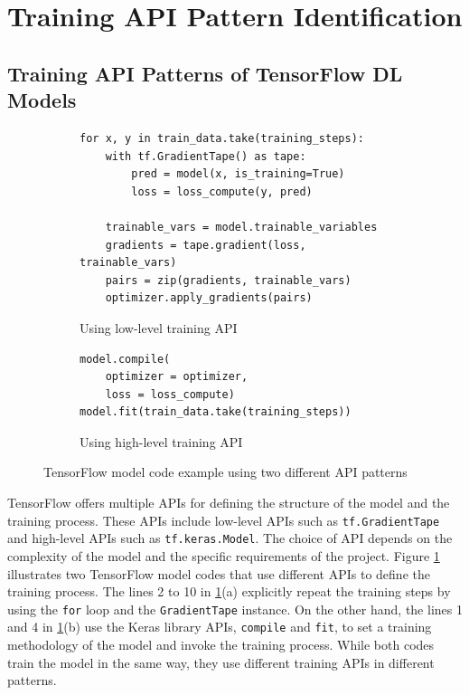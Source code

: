 \pagebreak
\section{Training API Pattern Identification}\label{sec:pattern}

\subsection{Training API Patterns of TensorFlow DL Models}

\begin{figure}[ht!]
\centering
  \begin{subfigure}[b]{\textwidth}
    \begin{lstlisting}[style=mpython]
for x, y in train_data.take(training_steps):
    with tf.GradientTape() as tape:
        pred = model(x, is_training=True)
        loss = loss_compute(y, pred)

    trainable_vars = model.trainable_variables
    gradients = tape.gradient(loss, trainable_vars)
    pairs = zip(gradients, trainable_vars)
    optimizer.apply_gradients(pairs)\end{lstlisting}
    \caption{Using low-level training API}
  \end{subfigure}
  \hspace{5mm}
  \begin{subfigure}[b]{\textwidth}
    \begin{lstlisting}[style=mpython]
model.compile(
    optimizer = optimizer, 
    loss = loss_compute) 
model.fit(train_data.take(training_steps))\end{lstlisting} 
    \caption{Using high-level training API}
  \end{subfigure}

  \caption{TensorFlow model code example using two different API patterns}
  \label{fig:pattern:ex01}
\end{figure}

TensorFlow offers multiple APIs for defining the structure of the model and the
training process. 
These APIs include low-level APIs such as {\tt tf.GradientTape} and high-level
APIs such as {\tt tf.keras.Model}.
The choice of API depends on the complexity of the model and the specific
requirements of the project.
Figure \ref{fig:pattern:ex01} illustrates two TensorFlow model codes that use
different APIs to define the training process. 
The lines 2 to 10 in \ref{fig:pattern:ex01}(a) explicitly repeat the training
steps by using the {\tt for} loop and the {\tt GradientTape} instance. 
On the other hand, the lines 1 and 4 in \ref{fig:pattern:ex01}(b) use the Keras
library APIs, {\tt compile} and {\tt fit}, to set a training methodology of the
model and invoke the training process. 
While both codes train the model in the same way, they use different training
APIs in different patterns.

